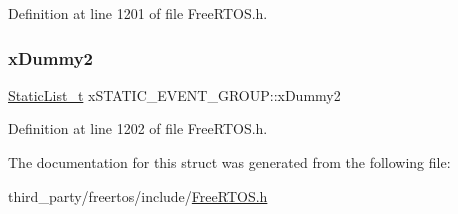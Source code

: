 Definition at line 1201 of file Free\+R\+T\+O\+S.\+h.

\mbox{\label{structxSTATIC__EVENT__GROUP_a17d070c972ecd0151d7505a539653551}} 
\subsubsection{\texorpdfstring{x\+Dummy2}{xDummy2}}
{\footnotesize\ttfamily \hyperlink{FreeRTOS_8h_a9735ad9101a2bd25f83a62089a4acee6}{Static\+List\+\_\+t} x\+S\+T\+A\+T\+I\+C\+\_\+\+E\+V\+E\+N\+T\+\_\+\+G\+R\+O\+U\+P\+::x\+Dummy2}



Definition at line 1202 of file Free\+R\+T\+O\+S.\+h.



The documentation for this struct was generated from the following file\+:\begin{DoxyCompactItemize}
\item 
third\+\_\+party/freertos/include/\hyperlink{FreeRTOS_8h}{Free\+R\+T\+O\+S.\+h}\end{DoxyCompactItemize}
